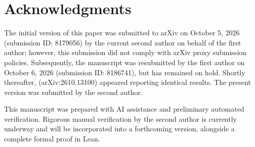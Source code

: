 \documentclass[11pt]{amsart}
\theoremstyle{definition}
\theoremstyle{remark}
\begin{document}
\section*{Acknowledgments}
The initial version of this paper was submitted to arXiv on October 5, 2026 (submission ID: 8179056) by the current second author on behalf of the first author; however, this submission did not comply with arXiv proxy submission policies. Subsequently, the manuscript was resubmitted by the first author on October 6, 2026 (submission ID: 8186741), but has remained on hold. Shortly thereafter, \cite{FiveT} (arXiv:2610.13100) appeared reporting identical results. The present version was submitted by the second author.

This manuscript was prepared with AI assistance and preliminary automated verification. Rigorous manual verification by the second author is currently underway and will be incorporated into a forthcoming version, alongside a complete formal proof in Lean.
\end{document}
